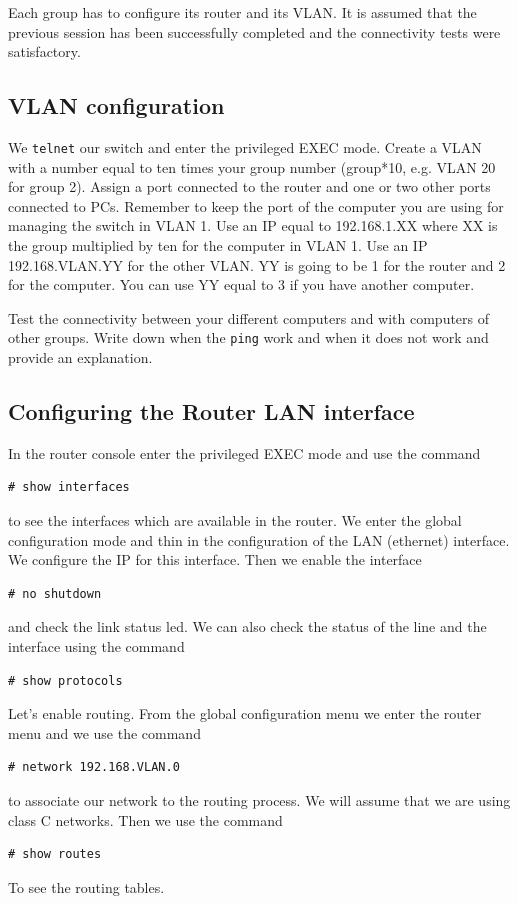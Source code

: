 Each group has to configure its router and its VLAN.
It is assumed that the previous session has been successfully completed and the connectivity tests were satisfactory.

\subsection{VLAN configuration}
We \texttt{telnet} our switch and enter the privileged EXEC mode.
Create a VLAN with a number equal to ten times your group number (group*10, e.g. VLAN 20 for group 2).
Assign a port connected to the router and one or two other ports connected to PCs. 
Remember to keep the port of the computer you are using for managing the switch in VLAN 1.
Use an IP equal to 192.168.1.XX where XX is the group multiplied by ten for the computer in VLAN 1.
Use an IP 192.168.VLAN.YY for the other VLAN. 
YY is going to be 1 for the router and 2 for the computer.
You can use YY equal to 3 if you have another computer.

Test the connectivity between your different computers and with computers of other groups.
Write down when the \texttt{ping} work and when it does not work and provide an explanation.

\subsection{Configuring the Router LAN interface}

In the router console enter the privileged EXEC mode and use the command 
\begin{lstlisting}
# show interfaces
\end{lstlisting}
to see the interfaces which are available in the router.
We enter the global configuration mode and thin in the configuration of the LAN (ethernet) interface.
We configure the IP for this interface.
Then we enable the interface
\begin{lstlisting}
# no shutdown
\end{lstlisting}
and check the link status led.
We can also check the status of the line and the interface using the command
\begin{lstlisting}
# show protocols
\end{lstlisting}

Let's enable routing.
From the global configuration menu we enter the router menu and we use the command
\begin{lstlisting}
# network 192.168.VLAN.0
\end{lstlisting}
to associate our network to the routing process.
We will assume that we are using class C networks.
Then we use the command
\begin{lstlisting}
# show routes
\end{lstlisting}
To see the routing tables.

